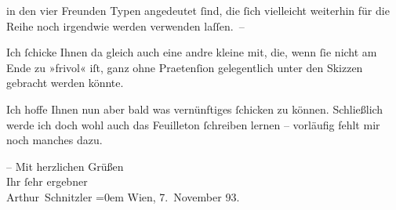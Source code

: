                in den vier Freunden \label{LL001-2v}Typen\label{LL001-2h} angedeutet{ }ſind, die{ }ſich vielleicht {\pb}weiterhin für die Reihe
               noch irgendwie werden verwenden laſſen. –\pend
           
\pstart
           Ich{ }ſchicke Ihnen da gleich auch eine andre kleine \label{K_L00280-2v}\label{K_L00280-2} mit, die, wenn{ }ſie nicht am Ende zu »frivol« iſt, ganz ohne Praetenſion
               gelegentlich unter den Skizzen gebracht werden könnte.\pend
           
\pstart
           Ich hoffe Ihnen nun aber bald was vernünftiges{ }ſchicken {\pb}zu können. \label{LL001-1v}Schließlich werde ich doch wohl auch das Feuilleton{ }ſchreiben lernen – vorläufig fehlt mir noch manches dazu\label{LL001-1h}.\pend
           
\pstart
           – Mit herzlichen Grüßen{\\[\baselineskip]}Ihr{ }ſehr ergebner{\\[\baselineskip]}\spacefill\mbox{Arthur Schnitzler}\pend
           \leftskip=0em{}
\pstart
           Wien, 7. November 93.\pend
           \endnumbering{}  \newcommand{\dateiname}{L00280}\newcommand{\titel}{Arthur Schnitzler an Hermann Bahr, 7. 11. 1893}\newcommand{\editorInnen}{Herausgegeben von Martin Anton Müller}
